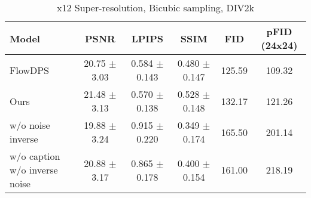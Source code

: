 
\begin{table}[h!]
\centering
\begin{tabular}{l|c|c|c|c|c}
\textbf{Model} & \textbf{PSNR} & \textbf{LPIPS} & \textbf{SSIM} & \textbf{FID} & \textbf{pFID (24x24)} \\
\hline
FlowDPS & 20.75 $\pm$ 3.03 & 0.584 $\pm$ 0.143 & 0.480 $\pm$ 0.147 & 125.59 & 109.32 \\
Ours & 21.48 $\pm$ 3.13 & 0.570 $\pm$ 0.138 & 0.528 $\pm$ 0.148 & 132.17 & 121.26 \\
w/o noise inverse & 19.88 $\pm$ 3.24 & 0.915 $\pm$ 0.220 & 0.349 $\pm$ 0.174 & 165.50 & 201.14 \\
w/o caption w/o inverse noise & 20.88 $\pm$ 3.17 & 0.865 $\pm$ 0.178 & 0.400 $\pm$ 0.154 & 161.00 & 218.19 \\

\end{tabular}
\caption{x12 Super-resolution, Bicubic sampling, DIV2k}
\label{tab:model_metrics}
\end{table}